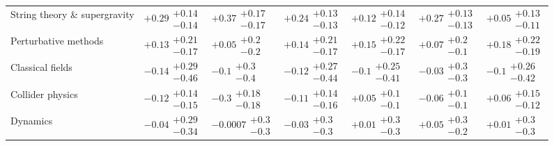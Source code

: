 \begin{table}[H]
\begin{tabular}{lllllll}
String theory \& supergravity             &    $\bm{+0.29}\substack{+0.14 \\ -0.14}$ &    $\bm{+0.37}\substack{+0.17 \\ -0.17}$ &    $\bm{+0.24}\substack{+0.13 \\ -0.13}$ &         $+0.12\substack{+0.14 \\ -0.12}$ &    $\bm{+0.27}\substack{+0.13 \\ -0.13}$ &         $+0.05\substack{+0.13 \\ -0.11}$ \\
Perturbative methods                      &         $+0.13\substack{+0.21 \\ -0.17}$ &           $+0.05\substack{+0.2 \\ -0.2}$ &         $+0.14\substack{+0.21 \\ -0.17}$ &         $+0.15\substack{+0.22 \\ -0.17}$ &           $+0.07\substack{+0.2 \\ -0.1}$ &         $+0.18\substack{+0.22 \\ -0.19}$ \\
Classical fields                          &         $-0.14\substack{+0.29 \\ -0.46}$ &            $-0.1\substack{+0.3 \\ -0.4}$ &         $-0.12\substack{+0.27 \\ -0.44}$ &          $-0.1\substack{+0.25 \\ -0.41}$ &           $-0.03\substack{+0.3 \\ -0.3}$ &          $-0.1\substack{+0.26 \\ -0.42}$ \\
Collider physics                          &         $-0.12\substack{+0.14 \\ -0.15}$ &     $\bm{-0.3}\substack{+0.18 \\ -0.18}$ &         $-0.11\substack{+0.14 \\ -0.16}$ &           $+0.05\substack{+0.1 \\ -0.1}$ &           $-0.06\substack{+0.1 \\ -0.1}$ &         $+0.06\substack{+0.15 \\ -0.12}$ \\
Dynamics                                  &         $-0.04\substack{+0.29 \\ -0.34}$ &         $-0.0007\substack{+0.3 \\ -0.3}$ &           $-0.03\substack{+0.3 \\ -0.3}$ &           $+0.01\substack{+0.3 \\ -0.3}$ &           $+0.05\substack{+0.3 \\ -0.2}$ &           $+0.01\substack{+0.3 \\ -0.3}$ \\

\end{tabular}
\end{table}
